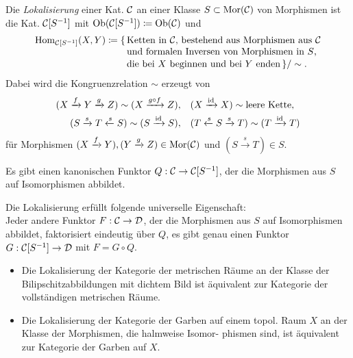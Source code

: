 \documentclass{cheat-sheet}
\begin{document}


\begin{defn}
  Die \emph{Lokalisierung} einer Kat. $\mathcal{C}$ an einer Klasse $S \subset \operatorname{Mor}(\mathcal{C})$ von Morphismen ist die Kat. $\mathcal{C}[S^{-1}]$ mit $\operatorname{Ob}(\mathcal{C}[S^{-1}]) \coloneqq \operatorname{Ob}(\mathcal{C})$ und
  \begin{align*}
    \operatorname{Hom}_{\mathcal{C}[S^{-1}]}(X, Y) \coloneqq \{ \, & \text{Ketten in $\mathcal{C}$, bestehend aus Morphismen aus $\mathcal{C}$} \\[-4pt]
    & \text{und formalen Inversen von Morphismen in $S$,} \\[-2pt]
    & \text{die bei $X$ beginnen und bei $Y$ enden} \, \} / \sim.
  \end{align*}
  Dabei wird die Kongruenzrelation ${\sim}$ erzeugt von
  \begin{align*}
    (X \xrightarrow{f} Y \xrightarrow{g} Z) \sim (X \xrightarrow{g \circ f} Z), \quad
    & (X \xrightarrow{\operatorname{id}} X) \sim \text{leere Kette}, \\
    (S \xrightarrow{s} T \xleftarrow{s} S) \sim (S \xrightarrow{\operatorname{id}} S), \quad
    & (T \xleftarrow{s} S \xrightarrow{s} T) \sim (T \xrightarrow{\operatorname{id}} T)
  \end{align*}
  für Morphismen $(X \xrightarrow{f} Y), (Y \xrightarrow{g} Z) \in \operatorname{Mor}(\mathcal{C})$ und $(S \xrightarrow{s} T) \in S$.
\end{defn}

\begin{bem}
  Es gibt einen kanonischen Funktor $Q : \mathcal{C} \to \mathcal{C}[S^{-1}]$, der die Morphismen aus $S$ auf Isomorphismen abbildet.
\end{bem}

\begin{lem}
  Die Lokalisierung erfüllt folgende universelle Eigenschaft: \\
  Jeder andere Funktor $F : \mathcal{C} \to \mathcal{D}$, der die Morphismen aus $S$ auf Isomorphismen abbildet, faktorisiert eindeutig über $Q$, \dh{} es gibt genau einen Funktor $G : \mathcal{C}[S^{-1}] \to \mathcal{D}$ mit $F = G \circ Q$.
\end{lem}

\begin{bspe}
  \begin{itemize}
    \item Die Lokalisierung der Kategorie der metrischen Räume an der Klasse der Bilipschitzabbildungen mit dichtem Bild ist äquivalent zur Kategorie der vollständigen metrischen Räume.
    \item Die Lokalisierung der Kategorie der Garben auf einem topol. Raum $X$ an der Klasse der Morphismen, die halmweise Isomor- phismen sind, ist äquivalent zur Kategorie der Garben auf $X$.
  \end{itemize}
\end{bspe}
\end{document}
